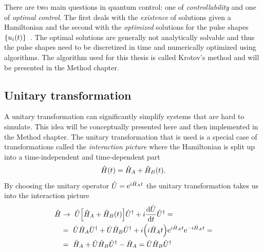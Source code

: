 \documentclass[main.tex]{subfiles}
\begin{document}
There are two main questions in quantum control: one of \emph{controllability} and one of \emph{optimal control}.
The first deals with the \emph{existence} of solutions given a Hamiltonian and the second with the \emph{optimized} solutions for the pulse shapes \(\qty{u_i(t)}\)~\cite{dalessandro_introduction_2007}.
The optimal solutions are generally not analytically solvable and thus the pulse shapes need to be discretized in time and numerically optimized using algorithms.
The algorithm used for this thesis is called Krotov's method and will be presented in the Method chapter.

\subsection{Unitary transformation}
A unitary transformation can significantly simplify systems that are hard to simulate.
This idea will be conceptually presented here and then implemented in the Method chapter.
The unitary transformation that is used is a special case of transformations called the \emph{interaction picture} where the Hamiltonian is split up into a time-independent and time-dependent part
\begin{equation}
    \hat{H}(t) = \hat{H}_A + \hat{H}_B(t).
\end{equation}
By choosing the unitary operator \( \hat{U} = \mathrm{e}^{i \hat{H}_A t} \) the unitary transformation takes us into the interaction picture
\begin{align*}
    \hat{H} &\rightarrow~ \hat{U}\qty[ \hat{H}_A  + \hat{H}_B(t)]\hat{U}^\dagger + i\dv{\hat{U}}{t}\hat{U}^\dagger =\\
    &=~ \hat{U}\hat{H}_A\hat{U}^\dagger + \hat{U}\hat{H}_B\hat{U}^\dagger + i\qty(i\hat{H}_A t)\mathrm{e}^{i \hat{H}_A t}\mathrm{e}^{-i\hat{H}_A t}=\\
    &=~ \hat{H}_A + \hat{U}\hat{H}_B\hat{U}^\dagger - \hat{H}_A = \hat{U}\hat{H}_B\hat{U}^\dagger
\end{align*}
\end{document}
